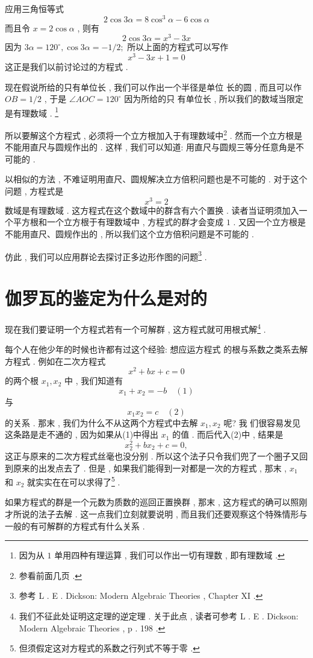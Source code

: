 应用三角恒等式
\[
2 \cos 3 \alpha=8 \cos ^{3} \alpha-6 \cos \alpha
\]
而且令 $x=2 \cos \alpha$ ,  则有
\[
2 \cos 3 \alpha=x^{3}-3 x
\]
因为 $3 \alpha=120^{\circ} ,  \cos 3 \alpha=-1 / 2 ;$ 所以上面的方程式可以写作
\[
x^{3}-3 x+1=0
\]
这正是我们以前讨论过的方程式 . 

现在假说所给的只有单位长 , 我们可以作出一个半径是单位 长的圆 , 而且可以作 $O B=1 / 2$ ,  于是 $\angle A O C=120^{\circ}$ 因为所给的只
有单位长 , 所以我们的数域当限定是有理数域 . \footnote{因为从 $1$ 单用四种有理运算 ,  我们可以作出一切有理数 ,  即有理数域 . }

所以要解这个方程式 , 必须将一个立方根加入于有理数域中\footnote{参看前面几页 . } . 然而一个立方根是不能用直尺与圆规作出的 . 这样 , 我们可以知道: 用直尺与圆规三等分任意角是不可能的 . 

以相似的方法 , 不难证明用直尺、圆规解决立方倍积问题也是不可能的 . 对于这个问题 , 方程式是
\[
x^{3}=2
\]
数域是有理数域 . 这方程式在这个数域中的群含有六个置换 . 读者当证明须加入一个平方根和一个立方根于有理数域中 , 方程式的群才会变成 $1$  . 又因一个立方根是不能用直尺、圆规作出的 , 所以我们这个立方倍积问题是不可能的 . 

仿此 , 我们可以应用群论去探讨正多边形作图的问题\footnote{参考 L . E . Dickson: Modern Algebraic Theories ,  Chapter XI . } . 

\section{伽罗瓦的鉴定为什么是对的}

现在我们要证明一个方程式若有一个可解群 , 这方程式就可用根式解\footnote{我们不征此处证明这定理的逆定理 . 关于此点 , 读者可参考 L .  E .  Dickson:
	Modern Algebraic Theories , p . 198 . } . 

每个人在他少年的时候也许都有过这个经验: 想应运方程式
的根与系数之类系去解方程式 . 例如在二次方程式
\[
x^{2}+b x+c=0
\]
的两个根 $x_{1} ,  x_{2}$ 中 , 我们知道有
\[
x_{1}+x_{2}=-b \quad (1)
\]
与
\[
x_{1} x_{2}=c \quad (2)
\]
的关系 . 那末 , 我们为什么不从这两个方程式中去解 $x_{1} ,  x_{2}$ 呢? 我 们很容易发见这条路是走不通的 , 因为如果从(1)中得出 $x_{1}$ 的值 . 而后代入(2)中 , 结果是
\[
x_{2}^{2}+b x_{2}+c=0 , 
\]
这正与原来的二次方程式丝毫也没分别 . 所以这个法子只令我们兜了一个圈子又回到原来的出发点去了 . 但是 , 如果我们能得到一对都是一次的方程式 , 那末 ,  $x_{1}$ 和 $x_{2}$ 就实实在在可以求得了\footnote{但须假定这对方程式的系数之行列式不等于零 . } . 

如果方程式的群是一个元数为质数的巡回正置换群 , 那末 , 这方程式的确可以照刚才所说的法子去解 . 这一点我们立刻就要说明 , 而且我们还要观察这个特殊情形与一般的有可解群的方程式有什么关系 . 

